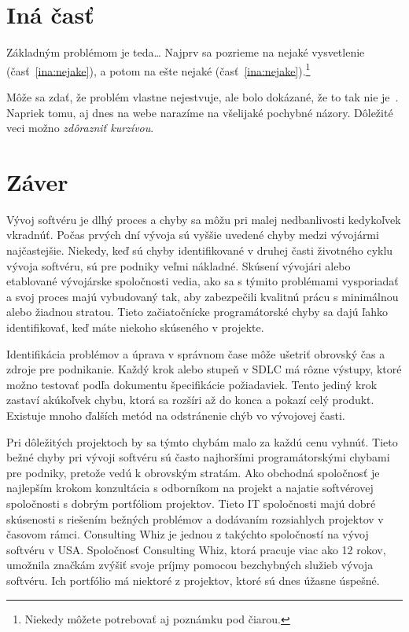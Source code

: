 \documentclass[10pt,twoside,slovak,a4paper]{article}
\begin{document}
\section{Iná časť} \label{ina}

Základným problémom je teda\ldots{} Najprv sa pozrieme na nejaké vysvetlenie (časť~\ref{ina:nejake}), a potom na ešte nejaké (časť~\ref{ina:nejake}).\footnote{Niekedy môžete potrebovať aj poznámku pod čiarou.}

Môže sa zdať, že problém vlastne nejestvuje\cite{Coplien:MPD}, ale bolo dokázané, že to tak nie je~\cite{Czarnecki:Staged, Czarnecki:Progress}. Napriek tomu, aj dnes na webe narazíme na všelijaké pochybné názory\cite{PLP-Framework}. Dôležité veci možno \emph{zdôrazniť kurzívou}.



\section{Záver} \label{zaver} %
Vývoj softvéru je dlhý proces a chyby sa môžu pri malej nedbanlivosti kedykoľvek vkradnúť. Počas prvých dní vývoja sú vyššie uvedené chyby medzi vývojármi najčastejšie. Niekedy, keď sú chyby identifikované v druhej časti životného cyklu vývoja softvéru, sú pre podniky veľmi nákladné. Skúsení vývojári alebo etablované vývojárske spoločnosti vedia, ako sa s týmito problémami vysporiadať a svoj proces majú vybudovaný tak, aby zabezpečili kvalitnú prácu s minimálnou alebo žiadnou stratou. Tieto začiatočnícke programátorské chyby sa dajú ľahko identifikovať, keď máte niekoho skúseného v projekte.

Identifikácia problémov a úprava v správnom čase môže ušetriť obrovský čas a zdroje pre podnikanie. Každý krok alebo stupeň v SDLC má rôzne výstupy, ktoré možno testovať podľa dokumentu špecifikácie požiadaviek. Tento jediný krok zastaví akúkoľvek chybu, ktorá sa rozšíri až do konca a pokazí celý produkt. Existuje mnoho ďalších metód na odstránenie chýb vo vývojovej časti.

Pri dôležitých projektoch by sa týmto chybám malo za každú cenu vyhnúť. Tieto bežné chyby pri vývoji softvéru sú často najhoršími programátorskými chybami pre podniky, pretože vedú k obrovským stratám. Ako obchodná spoločnosť je najlepším krokom konzultácia s odborníkom na projekt a najatie softvérovej spoločnosti s dobrým portfóliom projektov. Tieto IT spoločnosti majú dobré skúsenosti s riešením bežných problémov a dodávaním rozsiahlych projektov v časovom rámci. Consulting Whiz je jednou z takýchto spoločností na vývoj softvéru v USA. Spoločnosť Consulting Whiz, ktorá pracuje viac ako 12 rokov, umožnila značkám zvýšiť svoje príjmy pomocou bezchybných služieb vývoja softvéru. Ich portfólio má niektoré z projektov, ktoré sú dnes úžasne úspešné.




\end{document}
